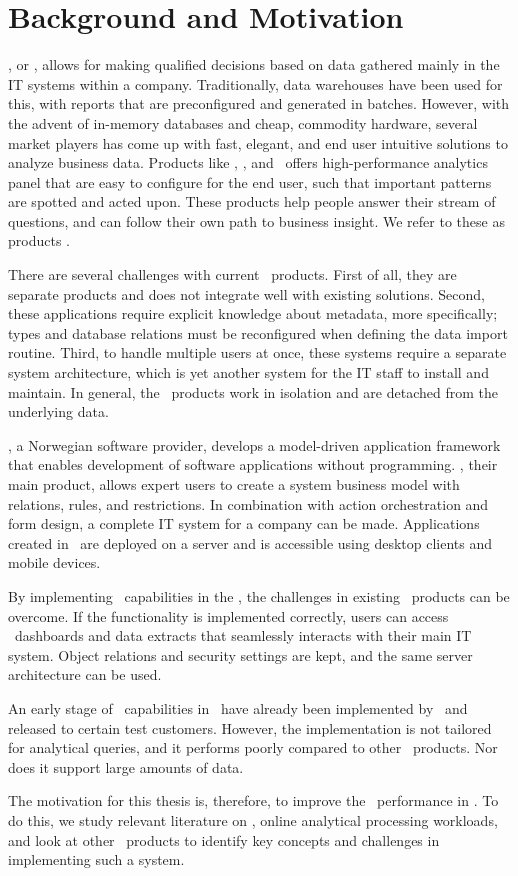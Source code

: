\section{Background and Motivation}
\label{sec:background-and-motivation}

\bi, or \ba, allows for making qualified decisions based on data gathered mainly in the IT systems within a company. Traditionally, data warehouses have been used for this, with reports that are preconfigured and generated in batches. However, with the advent of in-memory databases and cheap, commodity hardware, several market players has come up with fast, elegant, and end user intuitive solutions to analyze business data. Products like \qlikview, \tableau, and \powerpivot~offers high-performance analytics panel that are easy to configure for the end user, such that important patterns are spotted and acted upon. These products help people answer their stream of questions, and can follow their own path to business insight. We refer to these as  products \cite{Qlik2014-vd}.

There are several challenges with current \bd~products. First of all, they are separate products and does not integrate well with existing solutions. Second, these applications require explicit knowledge about metadata, more specifically; types and database relations must be reconfigured when defining the data import routine.  Third, to handle multiple users at once, these systems require a separate system architecture, which is yet another system for the IT staff to install and maintain. In general, the \bd~products work in isolation and are detached from the underlying data.

\genus, a Norwegian software provider, develops a model-driven application framework that enables development of software applications without programming. \genusSoftware, their main product, allows expert users to create a system business model with relations, rules, and restrictions. In combination with action orchestration and form design, a complete IT system for a company can be made. Applications created in \genusSoftware~are deployed on a server and is accessible using desktop clients and mobile devices.

By implementing \bd~capabilities in the \genusSoftware, the challenges in existing \bd~products can be overcome. If the functionality is implemented correctly, users can access \bd~dashboards and data extracts that seamlessly interacts with their main IT system. Object relations and security settings are kept, and the same server architecture can be used. 

An early stage of \bd~capabilities in \genusSoftware~have already been implemented by \genus~and released to certain test customers. However, the implementation is not tailored for analytical queries, and it performs poorly compared to other \bd~products. Nor does it support large amounts of data. 

The motivation for this thesis is, therefore, to improve the \bd~performance in \genusSoftware. To do this, we study relevant literature on \bi, online analytical processing workloads, and look at other \bd~products to identify key concepts and challenges in implementing such a system. 
